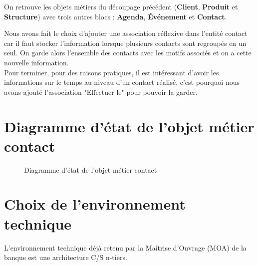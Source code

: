 On retrouve les objets métiers du découpage précédent (\textbf{Client}, \textbf{Produit} et \textbf{Structure}) avec trois autres blocs : \textbf{Agenda}, \textbf{Événement} et \textbf{Contact}. \\


Nous avons fait le choix d'ajouter une association réflexive dans l'entité contact car il faut stocker l'information lorsque plusieurs contacts sont regroupés en un seul. On garde alors l'ensemble des contacts avec les motifs associés et on a cette nouvelle information. \\

Pour terminer, pour des raisons pratiques, il est intéressant d'avoir les informations sur le temps au niveau d'un contact réalisé, c'est pourquoi nous avons ajouté l'association "Effectuer le" pour pouvoir la garder. \\

\section{Diagramme d’état de l'objet métier \bf{contact}}

\begin{figure}[H]
\noindent{}
\caption{Diagramme d'état de l'objet métier contact}
\end{figure}

\section{Choix  de  l’environnement  technique}
L’environnement  technique  déjà  retenu  par  la 
Maîtrise d’Ouvrage (MOA) de la banque est une architecture C/S n-tiers. 